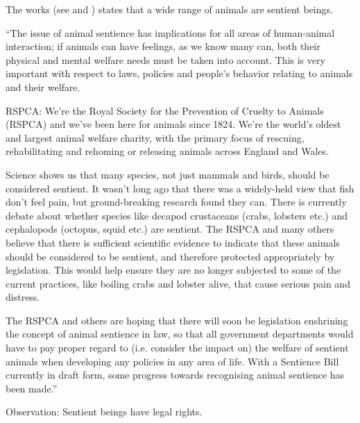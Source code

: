\documentclass[10pt,a4paper]{article}
\begin{document}
    The works (see \cite{bekoff2009encyclopedia} and \cite{fine2015forward}) states that a wide range of animals are sentient beings. 

	
	“The issue of animal sentience has implications for all areas of human-animal interaction; if animals can have feelings, as we know many can, both their physical and mental welfare needs must be taken into account. This is very important with respect to laws, policies and people's behavior relating to animals and their welfare.
	
	RSPCA: We're the Royal Society for the Prevention of Cruelty to Animals (RSPCA) and we've been here for animals since 1824. We're the world's oldest and largest animal welfare charity, with the primary focus of rescuing, rehabilitating and rehoming or releasing animals across England and Wales.
	
	Science shows us that many species, not just mammals and birds, should be considered sentient. It wasn't long ago that there was a widely-held view that fish don't feel pain, but ground-breaking research found they can. There is currently debate about whether species like decapod crustaceans (crabs, lobsters etc.) and cephalopods (octopus, squid etc.) are sentient. The RSPCA and many others believe that there is sufficient scientific evidence to indicate that these animals should be considered to be sentient, and therefore protected appropriately by legislation. This would help ensure they are no longer subjected to some of the current practices, like boiling crabs and lobster alive, that cause serious pain and distress.
	
	The RSPCA and others are hoping that there will soon be legislation enshrining the concept of animal sentience in law, so that all government departments would have to pay proper regard to (i.e. consider the impact on) the welfare of sentient animals when developing any policies in any area of life. With a Sentience Bill currently in draft form, some progress towards recognising animal sentience has been made.”
	
	Observation: Sentient beings have legal rights.
	
\end{document}
